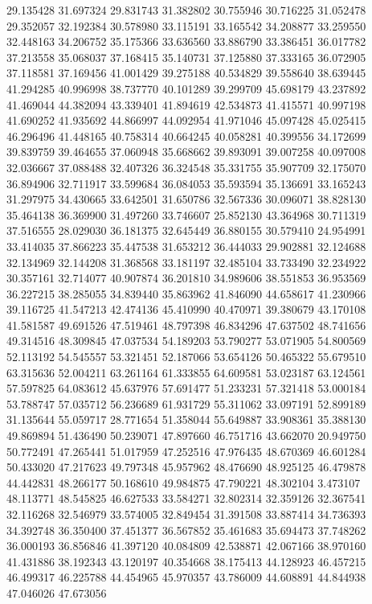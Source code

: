29.135428
31.697324
29.831743
31.382802
30.755946
30.716225
31.052478
29.352057
32.192384
30.578980
33.115191
33.165542
34.208877
33.259550
32.448163
34.206752
35.175366
33.636560
33.886790
33.386451
36.017782
37.213558
35.068037
37.168415
35.140731
37.125880
37.333165
36.072905
37.118581
37.169456
41.001429
39.275188
40.534829
39.558640
38.639445
41.294285
40.996998
38.737770
40.101289
39.299709
45.698179
43.237892
41.469044
44.382094
43.339401
41.894619
42.534873
41.415571
40.997198
41.690252
41.935692
44.866997
44.092954
41.971046
45.097428
45.025415
46.296496
41.448165
40.758314
40.664245
40.058281
40.399556
34.172699
39.839759
39.464655
37.060948
35.668662
39.893091
39.007258
40.097008
32.036667
37.088488
32.407326
36.324548
35.331755
35.907709
32.175070
36.894906
32.711917
33.599684
36.084053
35.593594
35.136691
33.165243
31.297975
34.430665
33.642501
31.650786
32.567336
30.096071
38.828130
35.464138
36.369900
31.497260
33.746607
25.852130
43.364968
30.711319
37.516555
28.029030
36.181375
32.645449
36.880155
30.579410
24.954991
33.414035
37.866223
35.447538
31.653212
36.444033
29.902881
32.124688
32.134969
32.144208
31.368568
33.181197
32.485104
33.733490
32.234922
30.357161
32.714077
40.907874
36.201810
34.989606
38.551853
36.953569
36.227215
38.285055
34.839440
35.863962
41.846090
44.658617
41.230966
39.116725
41.547213
42.474136
45.410990
40.470971
39.380679
43.170108
41.581587
49.691526
47.519461
48.797398
46.834296
47.637502
48.741656
49.314516
48.309845
47.037534
54.189203
53.790277
53.071905
54.800569
52.113192
54.545557
53.321451
52.187066
53.654126
50.465322
55.679510
63.315636
52.004211
63.261164
61.333855
64.609581
53.023187
63.124561
57.597825
64.083612
45.637976
57.691477
51.233231
57.321418
53.000184
53.788747
57.035712
56.236689
61.931729
55.311062
33.097191
52.899189
31.135644
55.059717
28.771654
51.358044
55.649887
33.908361
35.388130
49.869894
51.436490
50.239071
47.897660
46.751716
43.662070
20.949750
50.772491
47.265441
51.017959
47.252516
47.976435
48.670369
46.601284
50.433020
47.217623
49.797348
45.957962
48.476690
48.925125
46.479878
44.442831
48.266177
50.168610
49.984875
47.790221
48.302104
3.473107
48.113771
48.545825
46.627533
33.584271
32.802314
32.359126
32.367541
32.116268
32.546979
33.574005
32.849454
31.391508
33.887414
34.736393
34.392748
36.350400
37.451377
36.567852
35.461683
35.694473
37.748262
36.000193
36.856846
41.397120
40.084809
42.538871
42.067166
38.970160
41.431886
38.192343
43.120197
40.354668
38.175413
44.128923
46.457215
46.499317
46.225788
44.454965
45.970357
43.786009
44.608891
44.844938
47.046026
47.673056
